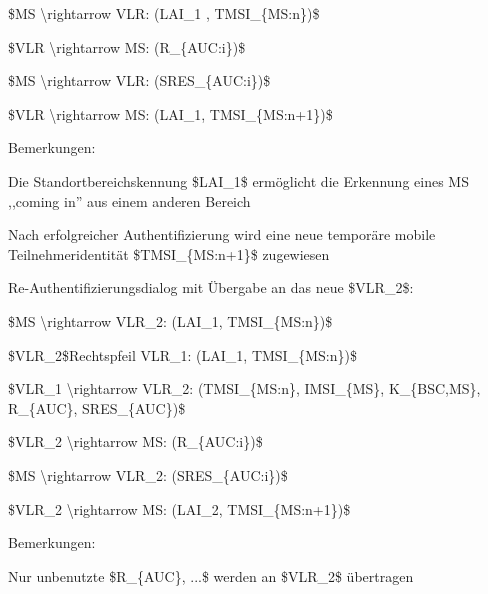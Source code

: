 \documentclass[a4paper]{article}
\begin{document}
\begin{multicols}{3}
\begin{itemize*}
            \begin{enumerate*}
                  \def\labelenumi{\arabic{enumi}.}
                  \item \$MS \textbackslash rightarrow VLR: (LAI\_1 , TMSI\_\{MS:n\})\$
                  \item \$VLR \textbackslash rightarrow MS: (R\_\{AUC:i\})\$
                  \item \$MS \textbackslash rightarrow VLR: (SRES\_\{AUC:i\})\$
                  \item \$VLR \textbackslash rightarrow MS: (LAI\_1, TMSI\_\{MS:n+1\})\$
            \end{enumerate*}
            \item Bemerkungen:
            \begin{itemize*}
                  \item Die Standortbereichskennung \$LAI\_1\$ ermöglicht die Erkennung eines MS ,,coming in'' aus einem anderen Bereich
                  \item Nach erfolgreicher Authentifizierung wird eine neue temporäre mobile Teilnehmeridentität \$TMSI\_\{MS:n+1\}\$ zugewiesen
            \end{itemize*}
            \item Re-Authentifizierungsdialog mit Übergabe an das neue \$VLR\_2\$:
            \begin{enumerate*}
                  \def\labelenumi{\arabic{enumi}.}
                  \item \$MS \textbackslash rightarrow VLR\_2: (LAI\_1, TMSI\_\{MS:n\})\$
                  \item \$VLR\_2\$Rechtspfeil VLR\_1: (LAI\_1, TMSI\_\{MS:n\})\$
                  \item \$VLR\_1 \textbackslash rightarrow VLR\_2: (TMSI\_\{MS:n\}, IMSI\_\{MS\}, K\_\{BSC,MS\}, R\_\{AUC\}, SRES\_\{AUC\})\$
                  \item \$VLR\_2 \textbackslash rightarrow MS: (R\_\{AUC:i\})\$
                  \item \$MS \textbackslash rightarrow VLR\_2: (SRES\_\{AUC:i\})\$
                  \item \$VLR\_2 \textbackslash rightarrow MS: (LAI\_2, TMSI\_\{MS:n+1\})\$
            \end{enumerate*}
            \item Bemerkungen:
            \begin{itemize*}
                  \item Nur unbenutzte \$R\_\{AUC\}, ...\$ werden an \$VLR\_2\$ übertragen

\end{itemize*}
\end{itemize*}
\end{multicols}
\end{document}
